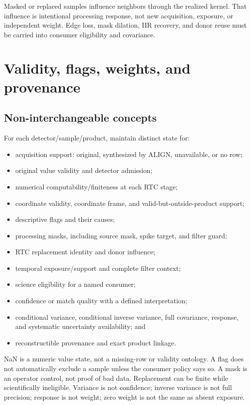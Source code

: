 \documentclass[11pt]{article}
\begin{document}
Masked or replaced samples influence neighbors through the realized kernel.
That influence is intentional processing response, not new acquisition,
exposure, or independent weight.  Edge loss, mask dilation, IIR recovery, and
donor reuse must be carried into consumer eligibility and covariance.

\section{Validity, flags, weights, and provenance}

\subsection{Non-interchangeable concepts}

For each detector/sample/product, maintain distinct state for:

\begin{itemize}
\item acquisition support: original, synthesized by ALIGN, unavailable, or no
      row;
\item original value validity and detector admission;
\item numerical computability/finiteness at each RTC stage;
\item coordinate validity, coordinate frame, and valid-but-outside-product
      support;
\item descriptive flags and their causes;
\item processing masks, including source mask, spike target, and filter guard;
\item RTC replacement identity and donor influence;
\item temporal exposure/support and complete filter context;
\item science eligibility for a named consumer;
\item confidence or match quality with a defined interpretation;
\item conditional variance, conditional inverse variance, full covariance,
      response, and systematic uncertainty availability; and
\item reconstructible provenance and exact product linkage.
\end{itemize}

NaN is a numeric value state, not a missing-row or validity ontology.  A flag
does not automatically exclude a sample unless the consumer policy says so.
A mask is an operator control, not proof of bad data.  Replacement can be
finite while scientifically ineligible.  Variance is not confidence;
inverse variance is not full precision; response is not weight; zero weight
is not the same as absent exposure.
\end{document}
